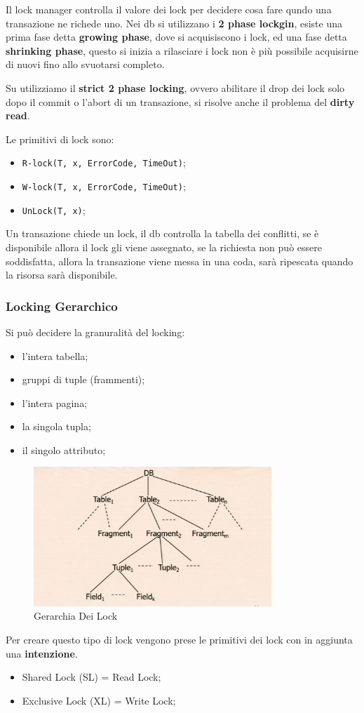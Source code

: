 \documentclass[12pt]{article}
\begin{document}
Il lock manager controlla il valore dei lock per decidere cosa fare qundo una transazione ne richede uno. Nei db si utilizzano i \textbf{2 phase lockgin}, esiste una prima fase detta \textbf{growing phase}, dove si acquisiscono i lock, ed una fase detta \textbf{shrinking phase}, questo si inizia a rilasciare i lock non \`e pi\`u possibile acquisirne di nuovi fino allo svuotarsi completo.

Su utilizziamo il \textbf{strict 2 phase locking}, ovvero abilitare il drop dei lock solo dopo il commit o l'abort di un transazione, si risolve anche il problema del \textbf{dirty read}.

Le primitivi di lock sono:
\begin{itemize}
    \item \texttt{R-lock(T, x, ErrorCode, TimeOut)};
    \item \texttt{W-lock(T, x, ErrorCode, TimeOut)};
    \item \texttt{UnLock(T, x)};
\end{itemize}
Un transazione chiede un lock, il db controlla la tabella dei conflitti, se \`e disponibile allora il lock gli viene assegnato, se la richiesta non pu\`o essere soddisfatta, allora la transazione viene messa in una coda, sar\`a ripescata quando la risorsa sar\`a disponibile.


\subsubsection{Locking Gerarchico}
Si pu\`o decidere la granuralit\`a del locking:
\begin{itemize}
    \item l'intera tabella;
    \item gruppi di tuple (frammenti);
    \item l'intera pagina;
    \item la singola tupla;
    \item il singolo attributo;
\end{itemize}
\begin{figure}[H]
    \centering
    \includegraphics[width=0.8\textwidth]{gerarchia-dei-lock.png}
    \caption{Gerarchia Dei Lock}
    \label{fig:gerarchia-dei-lock}
\end{figure}
Per creare questo tipo di lock vengono prese le primitivi dei lock con in aggiunta una \textbf{intenzione}.
\begin{itemize}
    \item Shared Lock (SL) = Read Lock;
    \item Exclusive Lock (XL) = Write Lock;
\end{itemize}
\end{document}
